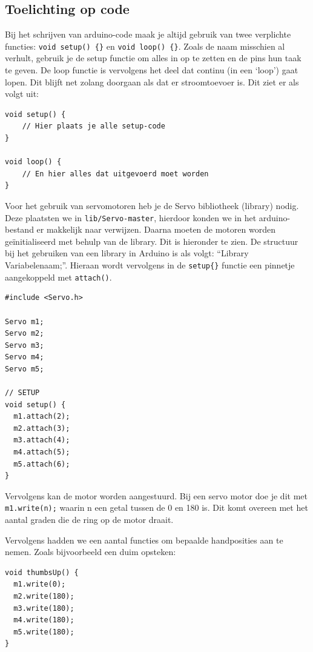 \hypertarget{toelichting-op-code}{%
\subsection{Toelichting op code}\label{toelichting-op-code}}

Bij het schrijven van arduino-code maak je altijd gebruik van twee
verplichte functies: \texttt{void\ setup()\ \{\}} en
\texttt{void\ loop()\ \{\}}. Zoals de naam misschien al verhult, gebruik
je de setup functie om alles in op te zetten en de pins hun taak te
geven. De loop functie is vervolgens het deel dat continu (in een
`loop') gaat lopen. Dit blijft net zolang doorgaan als dat er
stroomtoevoer is. Dit ziet er als volgt uit:

\begin{verbatim}
void setup() {
    // Hier plaats je alle setup-code
}

void loop() {
    // En hier alles dat uitgevoerd moet worden
}
\end{verbatim}

Voor het gebruik van servomotoren heb je de Servo bibliotheek (library)
nodig. Deze plaatsten we in \texttt{lib/Servo-master}, hierdoor konden
we in het arduino-bestand er makkelijk naar verwijzen. Daarna moeten de
motoren worden geïnitialiseerd met behulp van de library. Dit is
hieronder te zien. De structuur bij het gebruiken van een library in
Arduino is als volgt: ``Library Variabelenaam;''. Hieraan wordt
vervolgens in de \texttt{setup\{\}} functie een pinnetje aangekoppeld
met \texttt{attach()}.

\begin{verbatim}
#include <Servo.h>

Servo m1;
Servo m2;
Servo m3;
Servo m4;
Servo m5;

// SETUP
void setup() {
  m1.attach(2);
  m2.attach(3);
  m3.attach(4);
  m4.attach(5);
  m5.attach(6);
}
\end{verbatim}

Vervolgens kan de motor worden aangestuurd. Bij een servo motor doe je
dit met \texttt{m1.write(n);} waarin n een getal tussen de 0 en 180 is.
Dit komt overeen met het aantal graden die de ring op de motor draait.

Vervolgens hadden we een aantal functies om bepaalde handposities aan te
nemen. Zoals bijvoorbeeld een duim opsteken:

\begin{verbatim}
void thumbsUp() {
  m1.write(0);
  m2.write(180);
  m3.write(180);
  m4.write(180);
  m5.write(180);
}
\end{verbatim}

